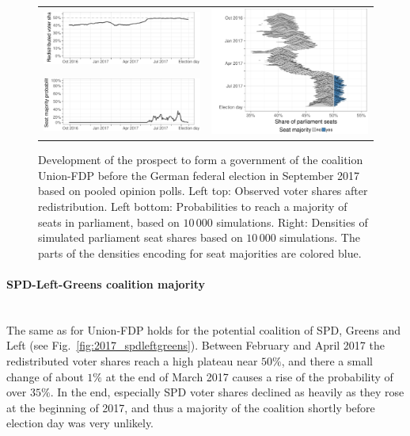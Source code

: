 \documentclass[smallcondensed]{svjour3}     %
\begin{document}
\begin{figure}[H]\centering
\begin{tabular}{ll}
\includegraphics[height=.15\textwidth]{figures/2017_pooled_cdufdp_rawSharesRedist.pdf}
&
\multirow{2}{*}[13ex]{\includegraphics[height=30ex]{figures/2017_pooled_cdufdp_ridgeline.pdf}}
\\
\includegraphics[height=.15\textwidth]{figures/2017_pooled_cdufdp_prob.pdf}
\end{tabular}
\caption{Development of the prospect to form a government of the coalition Union-FDP before the German federal election in September 2017 based on pooled opinion polls.
Left top: Observed voter shares after redistribution. Left bottom: Probabilities to reach a majority of seats in parliament, based on $10\,000$ simulations. Right: Densities of simulated parliament seat shares based on $10\,000$ simulations. The parts of the densities encoding for seat majorities are colored blue.
\label{fig:2017_cdufdp}
}
\end{figure}


\paragraph{SPD-Left-Greens coalition majority} \ \\
The same as for Union-FDP holds for the potential coalition of
SPD, Greens and Left (see Fig.~\ref{fig:2017_spdleftgreens}).
Between February and April 2017 the redistributed voter
shares reach a high plateau near $50\%$, and there a small change
of about $1\%$ at the end of March 2017 causes a rise of
the probability of over $35\%$.
In the end, especially SPD voter shares declined as heavily as
they rose at the beginning of 2017, and thus a majority of
the coalition shortly before election day was very unlikely.
\end{document}
